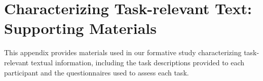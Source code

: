 \chapter{Characterizing Task-relevant Text: Supporting Materials}

This appendix provides materials used in our formative study characterizing task-relevant textual information,
including the task descriptions provided to each participant and the questionnaires used to assess each task.







